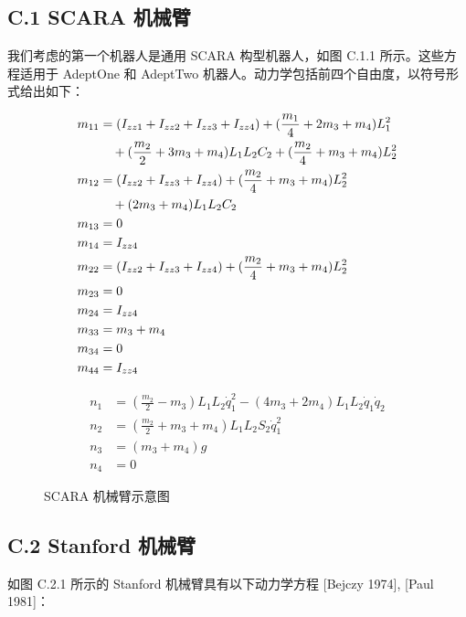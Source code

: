 \documentclass[UTF8]{ctexart}
\begin{document}
\subsection*{C.1 SCARA 机械臂}

我们考虑的第一个机器人是通用 SCARA 构型机器人，如图 C.1.1 所示。这些方程适用于 AdeptOne 和 AdeptTwo 机器人。动力学包括前四个自由度，以符号形式给出如下：

\begin{align*}
m_{11} &= (I_{zz1} + I_{zz2} + I_{zz3} + I_{zz4}) + (\frac{m_1}{4} + 2m_3 + m_4)L_1^2 \notag\\
&\quad + (\frac{m_2}{2} + 3m_3 + m_4)L_1L_2C_2 + (\frac{m_2}{4} + m_3 + m_4)L_2^2 \\
m_{12} &= (I_{zz2} + I_{zz3} + I_{zz4}) + (\frac{m_2}{4} + m_3 + m_4)L_2^2 \notag\\
&\quad + (2m_3 + m_4)L_1L_2C_2 \\
m_{13} &= 0 \\
m_{14} &= I_{zz4} \\
m_{22} &= (I_{zz2} + I_{zz3} + I_{zz4}) + (\frac{m_2}{4} + m_3 + m_4)L_2^2 \\
m_{23} &= 0 \\
m_{24} &= I_{zz4} \\
m_{33} &= m_3 + m_4 \\
m_{34} &= 0 \\
m_{44} &= I_{zz4}
\end{align*}

\begin{align*}
n_1 &= (\frac{m_2}{2} - m_3)L_1L_2\dot{q}_1^2 - (4m_3 + 2m_4)L_1L_2\dot{q}_1\dot{q}_2 \\
n_2 &= (\frac{m_2}{2} + m_3 + m_4)L_1L_2S_2\dot{q}_1^2 \\
n_3 &= (m_3 + m_4)g \\
n_4 &= 0
\end{align*}

\begin{figure}[H]
\centering
{}
\caption{SCARA 机械臂示意图}
\end{figure}

\subsection*{C.2 Stanford 机械臂}

如图 C.2.1 所示的 Stanford 机械臂具有以下动力学方程 [Bejczy 1974], [Paul 1981]：
\end{document}
